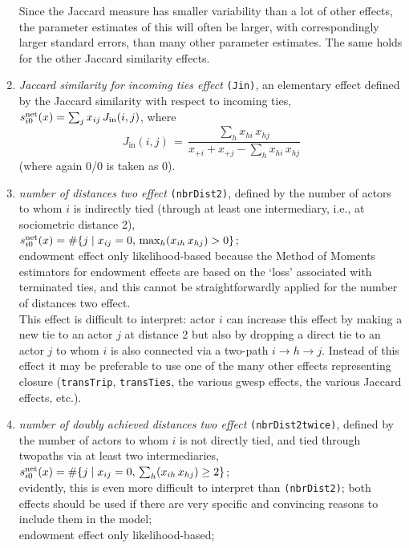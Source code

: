 \documentclass[a4paper,fleqn,11pt]{article}
\newcommand{\+}{\, + \,}
\newcommand{\vit}{\theenumi}
\begin{document}
\begin{enumerate}
 \noindent
 Since the Jaccard measure has smaller variability than a lot of other
 effects, the parameter estimates of this will often be larger,
 with correspondingly larger standard errors,
 than many other parameter estimates. The same holds for
 the other Jaccard similarity effects.

 \item {\em Jaccard similarity for incoming ties effect} \texttt{(Jin)},
 an elementary effect defined by
 the Jaccard similarity with respect to incoming ties,\\
 $s^{\rm net}_{i\vit}(x) =  \sum_j x_{ij} \, J_{\text{in}}(i,j)$, where
 \[
 J_{\text{in}}(i,j) \,=\, \frac{\sum_h x_{hi}\,x_{hj}}
                     {x_{+i} + x_{+j} - \sum_h x_{hi}\,x_{hj}}
 \]
 (where again 0/0 is taken as 0).

 \item {\em number of distances two effect} \texttt{(nbrDist2)},
 \hypertarget{T_dist2}{defined by}
 the number of actors to whom $i$ is indirectly tied
 (through at least one intermediary, i.e., at sociometric distance 2),\\
 $s^{\rm net}_{i\vit}(x) =  \#\{j \mid x_{ij} = 0,\, \max_h (x_{ih}\, x_{hj}) > 0 \}$;\\
 endowment effect only likelihood-based because the Method of Moments
 estimators for endowment effects are based on the `loss' associated
 with terminated ties, and this cannot be straightforwardly applied
 for the number of distances two effect.\\
 This effect is difficult to interpret: actor $i$ can increase this effect by making a
 new tie to an actor $j$ at distance 2 but also by dropping a direct tie to an
 actor $j$ to whom $i$ is also connected via a two-path
 $i \rightarrow h \rightarrow j$.
 Instead of this effect it may be preferable to use one of the many other
 effects representing closure (\texttt{transTrip}, \texttt{transTies},
 the various gwesp effects, the various Jaccard effects, etc.).

 \item {\em number of doubly achieved distances two effect} \texttt{(nbrDist2twice)},
 defined by
 the number of actors to whom $i$
 is not directly tied, and tied through twopaths via at least two intermediaries,\\
 $s^{\rm net}_{i\vit}(x) =  \#\{j \mid x_{ij} = 0,\, \sum_h (x_{ih}\, x_{hj}) \geq 2 \}$;\\
 evidently, this is even more difficult to interpret than \texttt{(nbrDist2)};
 both effects should be used if there are very specific
 and convincing reasons to include them in the model;\\
 endowment effect only likelihood-based;\\



\end{enumerate}
\end{document}
